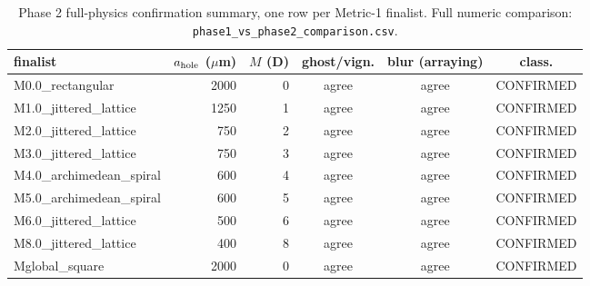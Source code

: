 \begin{table}[h]
\centering\small
\begin{tabular}{lrrccc}
\toprule
\textbf{finalist} & \textbf{$a_{\rm hole}$ ($\mu$m)} & \textbf{$M$ (D)} & \textbf{ghost/vign.} & \textbf{blur (arraying)} & \textbf{class.} \\
\midrule
M0.0\_rectangular & 2000 & 0 & agree & agree & CONFIRMED \\
M1.0\_jittered\_lattice & 1250 & 1 & agree & agree & CONFIRMED \\
M2.0\_jittered\_lattice & 750 & 2 & agree & agree & CONFIRMED \\
M3.0\_jittered\_lattice & 750 & 3 & agree & agree & CONFIRMED \\
M4.0\_archimedean\_spiral & 600 & 4 & agree & agree & CONFIRMED \\
M5.0\_archimedean\_spiral & 600 & 5 & agree & agree & CONFIRMED \\
M6.0\_jittered\_lattice & 500 & 6 & agree & agree & CONFIRMED \\
M8.0\_jittered\_lattice & 400 & 8 & agree & agree & CONFIRMED \\
Mglobal\_square & 2000 & 0 & agree & agree & CONFIRMED \\
\bottomrule
\end{tabular}
\caption{Phase 2 full-physics confirmation summary, one row per Metric-1 finalist. Full numeric comparison: \texttt{phase1\_vs\_phase2\_comparison.csv}.}
\end{table}
